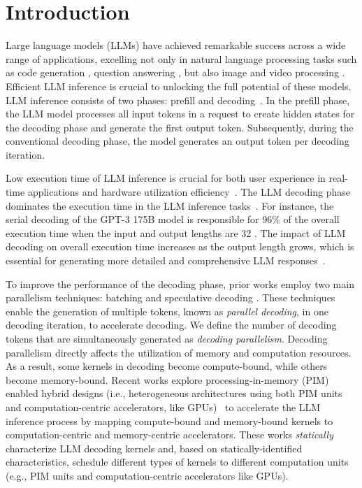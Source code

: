 \section{Introduction}
Large language models (LLMs) have achieved remarkable success across a wide range of applications, excelling not only in natural language processing tasks such as code generation \cite{chen2021evaluating, copilot}, question answering \cite{radford2019language, chowdhery2023palm}, but also image \cite{radford2021, dalle, rombach2022high} and video processing \cite{openai2024sora}. Efficient LLM inference is crucial to unlocking the full potential of these models. 
LLM inference consists of two phases: prefill and decoding~\cite{zhou2024survey}. In the prefill phase, the LLM model processes all input tokens in a request to create hidden states for the decoding phase and generate the first output token. Subsequently, during the conventional decoding phase, the model generates an output token per decoding iteration.


Low execution time of LLM inference is crucial for both user experience in real-time applications and hardware utilization efficiency~\cite{Shen2023Efficient}. The LLM decoding phase dominates the execution time in the LLM inference tasks~\cite{hong2022dfx, zhou2022transpim}. For instance, the serial decoding of the GPT-3 175B model is responsible for 96\% of the overall execution time when the input and output lengths are 32 \cite{choi2023unleashing}. The impact of LLM decoding on overall execution time increases as the output length grows, which is essential for generating more detailed and comprehensive LLM responses~\cite{bai2024longwriter}.


To improve the performance of the decoding phase, prior works employ two main parallelism techniques: batching \cite{yu2022orca, agrawal2023sarathi, patel2024splitwise} and speculative decoding \cite{leviathan2023fast, chen2023accelerating, spector2023accelerating, zhang2023draft}. These techniques enable the generation of multiple tokens, known as \textit{parallel decoding}, in one decoding iteration, to accelerate decoding.
We define the number of decoding tokens that are simultaneously generated as \textit{decoding parallelism}. 
Decoding parallelism directly affects the utilization of memory and computation resources.
As a result, some kernels in decoding become compute-bound, while others become memory-bound.
Recent works explore processing-in-memory (PIM) enabled hybrid designs (i.e., heterogeneous architectures using both PIM units and computation-centric accelerators, like GPUs)~\cite{heo2024neupims, park2024attacc, li2024specpim, seo2024ianus, pan2024instinfer} to accelerate the LLM inference process by mapping compute-bound and memory-bound kernels to computation-centric and memory-centric accelerators. These works \emph{statically} characterize LLM decoding kernels and, based on statically-identified characteristics, schedule different types of kernels to different computation units (e.g., PIM units and computation-centric accelerators like GPUs). 

